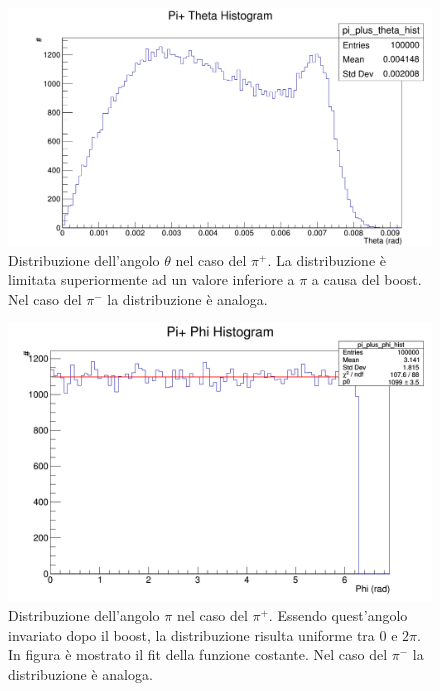 \documentclass[8pt]{extarticle}
\begin{document}
\begin{figure}
	\begin{center}
		\includegraphics[scale=0.3]{gen_theta} 
		\caption{Distribuzione dell'angolo $\theta$ nel caso del $\pi^+$. La distribuzione è limitata superiormente ad un valore inferiore a $\pi$ a causa del boost. Nel caso del $\pi^-$ la distribuzione è analoga.}
		\label{fig:gen_theta}
	\end{center}
\end{figure}

\begin{figure}
	\begin{center}
		\includegraphics[scale=0.3]{gen_phi} 
		\caption{Distribuzione dell'angolo $\pi$ nel caso del $\pi^+$. Essendo quest'angolo invariato dopo il boost, la distribuzione risulta uniforme tra $0$ e $2\pi$. In figura è mostrato il fit della funzione costante. Nel caso del $\pi^-$ la distribuzione è analoga.}
		\label{fig:gen_phi}
	\end{center}
\end{figure}
\end{document}
